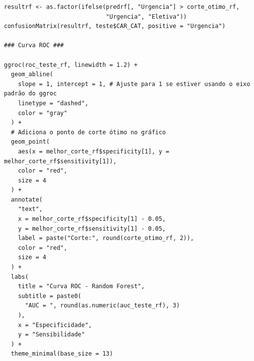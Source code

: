 \documentclass[12pt,a4paper]{article}
\begin{document}
\begin{lstlisting}[style=Rstyle, caption={Script R utilizado nas análises (\texttt{trabalhoEndometriose.R}).}]
resultrf <- as.factor(ifelse(predrf[, "Urgencia"] > corte_otimo_rf,
                             "Urgencia", "Eletiva"))
confusionMatrix(resultrf, teste$CAR_CAT, positive = "Urgencia")

### Curva ROC ###

ggroc(roc_teste_rf, linewidth = 1.2) +
  geom_abline(
    slope = 1, intercept = 1, # Ajuste para 1 se estiver usando o eixo padrão do ggroc
    linetype = "dashed",
    color = "gray"
  ) +
  # Adiciona o ponto de corte ótimo no gráfico
  geom_point(
    aes(x = melhor_corte_rf$specificity[1], y = melhor_corte_rf$sensitivity[1]),
    color = "red",
    size = 4
  ) +
  annotate(
    "text",
    x = melhor_corte_rf$specificity[1] - 0.05,
    y = melhor_corte_rf$sensitivity[1] - 0.05,
    label = paste("Corte:", round(corte_otimo_rf, 2)),
    color = "red",
    size = 4
  ) +
  labs(
    title = "Curva ROC - Random Forest",
    subtitle = paste0(
      "AUC = ", round(as.numeric(auc_teste_rf), 3)
    ),
    x = "Especificidade",
    y = "Sensibilidade"
  ) +
  theme_minimal(base_size = 13)
\end{lstlisting}
\end{document}
